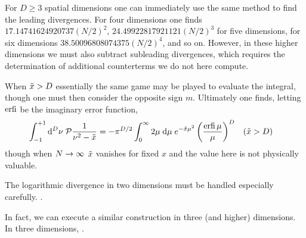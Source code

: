 For $D\geq3$ spatial dimensions one can immediately use the same method to find the leading divergences.
For four dimensions one finds $17.14741624920737 (N/2)^2$, $24.49922817921121 (N/2)^3$ for five dimensions, for six dimensions $38.50096808074375 (N/2)^4$, and so on.  However, in these higher dimensions we must also subtract subleading divergences, which requires the determination of additional counterterms we do not here compute.

When $\tilde{x} > D$ essentially the same game may be played to evaluate the integral, though one must then consider the opposite sign $m$.  Ultimately one finds, letting $\operatorname{erfi}$ be the imaginary error function,
\begin{align}
    \int_{-1}^{+1} \mathrm{d}^D\nu\; \mathcal{P} \frac{1}{\nu^2-\tilde{x}} &= -\pi^{D/2} \int_0^{\infty} 2\mu\; \mathrm{d}\mu\; e^{-\tilde{x} \mu^2} \left(\frac{\operatorname{erfi} \mu}{\mu}\right)^D
    &
    (\tilde{x}&>D)
\end{align}
though when $N\rightarrow\infty$ $\tilde{x}$ vanishes for fixed $x$ and the value here is not physically valuable.  

The logarithmic divergence in two dimensions must be handled especially carefully.
.

In fact, we can execute a similar construction in three (and higher) dimensions.  In three dimensions, .
